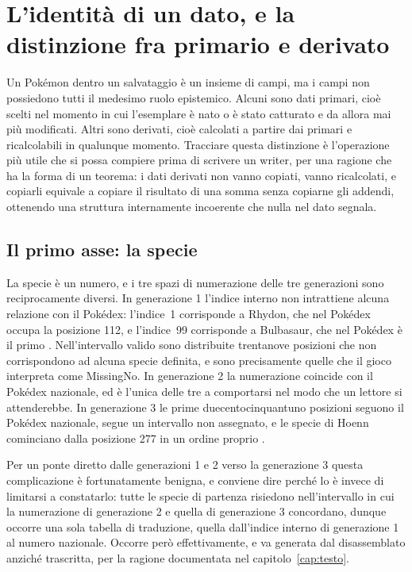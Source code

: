 
\chapter{L'identità di un dato, e la distinzione fra primario e derivato}
\label{cap:identita}

Un Pokémon dentro un salvataggio è un insieme di campi, ma i campi non possiedono tutti il medesimo ruolo epistemico. Alcuni sono dati primari, cioè scelti nel momento in cui l'esemplare è nato o è stato catturato e da allora mai più modificati. Altri sono derivati, cioè calcolati a partire dai primari e ricalcolabili in qualunque momento. Tracciare questa distinzione è l'operazione più utile che si possa compiere prima di scrivere un writer, per una ragione che ha la forma di un teorema: i dati derivati non vanno copiati, vanno ricalcolati, e copiarli equivale a copiare il risultato di una somma senza copiarne gli addendi, ottenendo una struttura internamente incoerente che nulla nel dato segnala.

\section{Il primo asse: la specie}

La specie è un numero, e i tre spazi di numerazione delle tre generazioni sono reciprocamente diversi. In generazione 1 l'indice interno non intrattiene alcuna relazione con il Pokédex: l'indice~1 corrisponde a Rhydon, che nel Pokédex occupa la posizione 112, e l'indice~99 corrisponde a Bulbasaur, che nel Pokédex è il primo \cite{pokered}. Nell'intervallo valido sono distribuite trentanove posizioni che non corrispondono ad alcuna specie definita, e sono precisamente quelle che il gioco interpreta come MissingNo. In generazione 2 la numerazione coincide con il Pokédex nazionale, ed è l'unica delle tre a comportarsi nel modo che un lettore si attenderebbe. In generazione 3 le prime duecentocinquantuno posizioni seguono il Pokédex nazionale, segue un intervallo non assegnato, e le specie di Hoenn cominciano dalla posizione 277 in un ordine proprio \cite{pokeemerald}.

Per un ponte diretto dalle generazioni 1 e 2 verso la generazione 3 questa complicazione è fortunatamente benigna, e conviene dire perché lo è invece di limitarsi a constatarlo: tutte le specie di partenza risiedono nell'intervallo in cui la numerazione di generazione 2 e quella di generazione 3 concordano, dunque occorre una sola tabella di traduzione, quella dall'indice interno di generazione 1 al numero nazionale. Occorre però effettivamente, e va generata dal disassemblato anziché trascritta, per la ragione documentata nel capitolo~\ref{cap:testo}.

